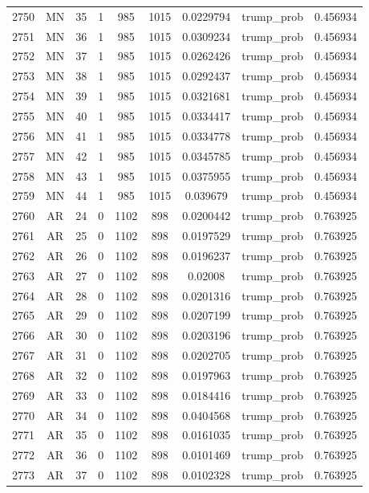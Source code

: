 \documentclass[12pt,a4paper]{article}
\begin{document}
\begin{tabular}{r|cccccccc}
	2750 & MN & 35 & 1 & 985 & 1015 & 0.0229794 & trump\_prob & 0.456934 \\
	2751 & MN & 36 & 1 & 985 & 1015 & 0.0309234 & trump\_prob & 0.456934 \\
	2752 & MN & 37 & 1 & 985 & 1015 & 0.0262426 & trump\_prob & 0.456934 \\
	2753 & MN & 38 & 1 & 985 & 1015 & 0.0292437 & trump\_prob & 0.456934 \\
	2754 & MN & 39 & 1 & 985 & 1015 & 0.0321681 & trump\_prob & 0.456934 \\
	2755 & MN & 40 & 1 & 985 & 1015 & 0.0334417 & trump\_prob & 0.456934 \\
	2756 & MN & 41 & 1 & 985 & 1015 & 0.0334778 & trump\_prob & 0.456934 \\
	2757 & MN & 42 & 1 & 985 & 1015 & 0.0345785 & trump\_prob & 0.456934 \\
	2758 & MN & 43 & 1 & 985 & 1015 & 0.0375955 & trump\_prob & 0.456934 \\
	2759 & MN & 44 & 1 & 985 & 1015 & 0.039679 & trump\_prob & 0.456934 \\
	2760 & AR & 24 & 0 & 1102 & 898 & 0.0200442 & trump\_prob & 0.763925 \\
	2761 & AR & 25 & 0 & 1102 & 898 & 0.0197529 & trump\_prob & 0.763925 \\
	2762 & AR & 26 & 0 & 1102 & 898 & 0.0196237 & trump\_prob & 0.763925 \\
	2763 & AR & 27 & 0 & 1102 & 898 & 0.02008 & trump\_prob & 0.763925 \\
	2764 & AR & 28 & 0 & 1102 & 898 & 0.0201316 & trump\_prob & 0.763925 \\
	2765 & AR & 29 & 0 & 1102 & 898 & 0.0207199 & trump\_prob & 0.763925 \\
	2766 & AR & 30 & 0 & 1102 & 898 & 0.0203196 & trump\_prob & 0.763925 \\
	2767 & AR & 31 & 0 & 1102 & 898 & 0.0202705 & trump\_prob & 0.763925 \\
	2768 & AR & 32 & 0 & 1102 & 898 & 0.0197963 & trump\_prob & 0.763925 \\
	2769 & AR & 33 & 0 & 1102 & 898 & 0.0184416 & trump\_prob & 0.763925 \\
	2770 & AR & 34 & 0 & 1102 & 898 & 0.0404568 & trump\_prob & 0.763925 \\
	2771 & AR & 35 & 0 & 1102 & 898 & 0.0161035 & trump\_prob & 0.763925 \\
	2772 & AR & 36 & 0 & 1102 & 898 & 0.0101469 & trump\_prob & 0.763925 \\
	2773 & AR & 37 & 0 & 1102 & 898 & 0.0102328 & trump\_prob & 0.763925 \\

\end{tabular}
\end{document}
